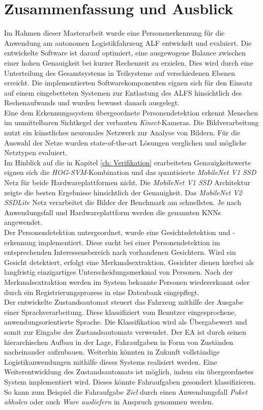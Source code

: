 \chapter{Zusammenfassung und Ausblick}
\label{Fazit und Ausblick}
	
Im Rahmen dieser Masterarbeit wurde eine Personenerkennung für die Anwendung am autonomen Logistikfahrzeug ALF entwickelt und evaluiert. Die entwickelte Software ist darauf optimiert, eine ausgewogene Balance zwischen einer hohen Genauigkeit bei kurzer Rechenzeit zu erzielen. Dies wird durch eine Unterteilung des Gesamtsystems in Teilsysteme auf verschiedenen Ebenen erreicht. Die implementierten Softwarekomponenten eignen sich für den Einsatz auf einem eingebetteten Systemen zur Entlastung des ALFS hinsichtlich des Rechenaufwands und wurden bewusst danach ausgelegt.\\

Eine dem Erkennungssystem übergeordnete Personendetektion erkennt Menschen im unmittelbaren Sichtkegel der verbauten \textit{Kinect}-Kameras. Die Bildverarbeitung nutzt ein künstliches neuronales Netzwerk zur Analyse von Bildern. Für die Auswahl der Netze wurden state-of-the-art Lösungen verglichen und mögliche Netztypen evaluiert.\\

Im Hinblick auf die in Kapitel \ref{ch: Verifikation} erarbeiteten Genauigkeitswerte eignen sich die \textit{HOG-SVM}-Kombination und das quantisierte \textit{MobileNet V1 SSD} Netz für beide Hardwareplattformen nicht. Die \textit{MobileNet V1 SSD} Architektur zeigte die besten Ergebnisse hinsichtlich der Genauigkeit. Das \textit{MobileNet V2 SSDLite} Netz verarbeitet die Bilder der Benchmark am schnellsten. Je nach Anwendungsfall und Hardwareplattform werden die genannten KNNs angewendet.     \\

Der Personendetektion untergeordnet, wurde eine Gesichtsdetektion und -erkennung implementiert. Diese sucht bei einer Personendetektion im entsprechenden Interessensbereich nach vorhandenen Gesichtern. Wird ein Gesicht detektiert, erfolgt eine Merkmalsextraktion. Gesichter dienen hierbei als langfristig einzigartiges Unterscheidungsmerkmal von Personen. Nach der Merkmalsextraktion werden im System bekannte Personen wiedererkannt oder durch ein Registrierungsprozess in eine Datenbank eingepflegt.\\
\newpage
Der entwickelte Zustandsautomat steuert das Fahrzeug mithilfe der Ausgabe einer Sprachverarbeitung. Diese klassifiziert vom Benutzer eingesprochene, anwendungsorientierte Sprache. Die Klassifikation wird als Übergabewert und somit zur Eingabe des Zustandsautomats verwendet. Der EA ist durch seinen hierarchischen Aufbau in der Lage, Fahraufgaben in Form von Zuständen nacheinander aufzubauen. Weiterhin könnten in Zukunft vollständige Logistikanwendungen mithilfe dieses Systems realisiert werden. Eine Weiterentwicklung des Zustandsautomats ist möglich, indem ein übergeordnetes System implementiert wird. Dieses könnte Fahraufgaben gesondert klassifizieren. So kann zum Beispiel die Fahraufgabe \textit{Ziel} durch einen Anwendungsfall \textit{Paket abholen} oder auch \textit{Ware ausliefern} in Anspruch genommen werden.\\


